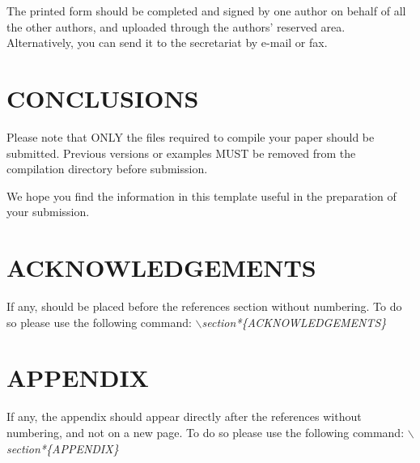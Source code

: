 \documentclass[a4paper,twoside]{article}
\begin{document}
The printed form should be completed and signed by one author on
behalf of all the other authors, and uploaded through the authors' reserved area. Alternatively, you can send it to the secretariat by e-mail or fax.

\section{\uppercase{Conclusions}}
\label{sec:conclusion}

\noindent Please note that ONLY the files required to compile your paper should be submitted. Previous versions or examples MUST be removed from the compilation directory before submission.

We hope you find the information in this template useful in the preparation of your submission.

\section*{\uppercase{Acknowledgements}}

\noindent If any, should be placed before the references section
without numbering. To do so please use the following command:
\textit{$\backslash$section*\{ACKNOWLEDGEMENTS\}}


\vfill

{\small
}


\section*{\uppercase{Appendix}}

\noindent If any, the appendix should appear directly after the
references without numbering, and not on a new page. To do so please use the following command:
\textit{$\backslash$section*\{APPENDIX\}}

\vfill
\end{document}
